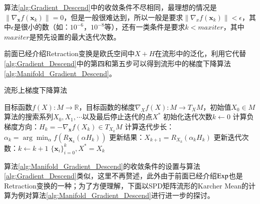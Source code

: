 算法\ref{alg:Gradient_Descend}中的收敛条件不尽相同，最理想的情况是$\|\nabla_{\bm{x}} f(\bm{x}_k)\|=0$，但是一般很难达到，所以一般是要求$\|\nabla_x f(\bm{x}_k)\|<\epsilon$，其中$\epsilon$是很小的数（如：$10^{-6}$，$10^{-8}$等），还有一类条件是要求$k<maxiter$，其中$maxiter$是预先设置的最大迭代次数。

前面已经介绍Retraction变换是欧氏空间中$X+H$在流形中的泛化，利用它代替\ref{alg:Gradient_Descend}中的第四和第五步可以得到流形中的梯度下降算法\ref{alg:Manifold_Gradient_Descend}。
\begin{algorithm}[htb]
\caption{流形上梯度下降算法}
\label{alg:Manifold_Gradient_Descend}
\begin{algorithmic}[1]
\REQUIRE 目标函数$f(X):M\rightarrow \mathbb{R}$，目标函数的梯度$\nabla_X f(X):M \rightarrow T_{X}M$，初始值$X_0 \in M$
\ENSURE 算法的搜索系列$X_0,X_1,\cdots$以及最后停止迭代的点$X^{*}$
\STATE 初始化迭代次数$k \leftarrow 0$
\STATE 计算负梯度方向：$H_{k}=-\nabla_{\bm{x}}f(X_k) \in T_{X_k}M$
\STATE 计算迭代步长：$\alpha_{k}=\arg\min_{\alpha}f(R_{\bm{X}_{k}}(\alpha H_{k}))$
\STATE 更新结果：$X_{k+1}=R_{X_{k}}(\alpha_{k}H_{k})$
\STATE 更新迭代次数：$k\leftarrow k+1$
\ENDWHILE
\RETURN $\{\bm{x}_i\}_{i=0}^{k},X^{*}=X_{k}$
\end{algorithmic}
\end{algorithm}

算法\ref{alg:Manifold_Gradient_Descend}的收敛条件的设置与算法\ref{alg:Gradient_Descend}类似，这里不再赘述，此外由于前面已经介绍$\rm Exp$也是Retraction变换的一种；为了方便理解，下面以SPD矩阵流形的Karcher Mean的计算为例对算法\ref{alg:Manifold_Gradient_Descend}进行进一步的探讨。

